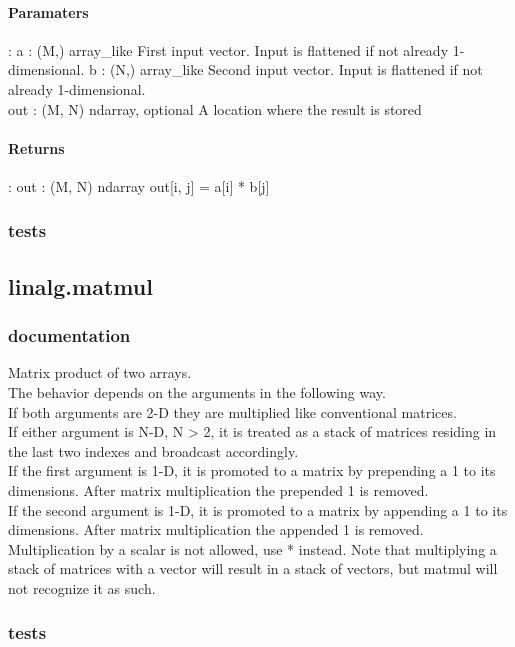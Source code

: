 \documentclass[a4paper,11pt]{article}
\begin{document}
\paragraph{Paramaters}: 
a : (M,) array\_like
First input vector. Input is flattened if not already 1-dimensional.
b : (N,) array\_like
Second input vector. Input is flattened if not already 1-dimensional.\\
out : (M, N) ndarray, optional
A location where the result is stored\\
\paragraph{Returns}:    
out : (M, N) ndarray
out[i, j] = a[i] * b[j]

\subsubsection{tests}

\subsection{linalg.matmul}
\subsubsection{documentation}
Matrix product of two arrays.\\

The behavior depends on the arguments in the following way.\\

If both arguments are 2-D they are multiplied like conventional matrices.\\
If either argument is N-D, N > 2, it is treated as a stack of matrices residing in the last two indexes and broadcast accordingly.\\
If the first argument is 1-D, it is promoted to a matrix by prepending a 1 to its dimensions. After matrix multiplication the prepended 1 is removed.\\
If the second argument is 1-D, it is promoted to a matrix by appending a 1 to its dimensions. After matrix multiplication the appended 1 is removed.\\
Multiplication by a scalar is not allowed, use * instead. Note that multiplying a stack of matrices with a vector will result in a stack of vectors, but matmul will not recognize it as such.\\

\subsubsection{tests}
\end{document}
